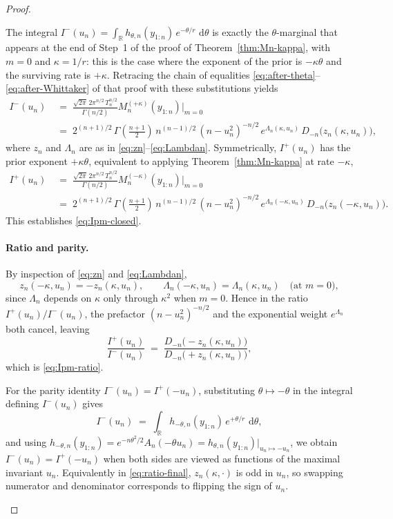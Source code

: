 \documentclass[12pt, a4paper]{report}
\newcommand{\dd}{\,\mathrm{d}}
\newcommand{\1}{\mathbf{1}}
\begin{document}
\begin{proof}
\begin{enumerate}
The integral $I^-(u_n) = \int_\mathbb{R} h_{\theta,n}(y_{1:n})\,e^{-\theta/r}\,
\dd\theta$ is exactly the $\theta$-marginal that appears at the end of
Step~1 of the proof of Theorem~\ref{thm:Mn-kappa}, with $m=0$ and
$\kappa = 1/r$: this is the case where the exponent of the prior is
$-\kappa\theta$ and the surviving rate is $+\kappa$. Retracing the
chain of equalities \eqref{eq:after-theta}--\eqref{eq:after-Whittaker}
of that proof with these substitutions yields
\begin{align*}
  I^-(u_n)
  &  \;=\; \frac{\sqrt{2\pi} \, 2\pi^{n/2} \, T_n^{n/2} }{\Gamma(n/2)} M_n^{(+\kappa)}(y_{1:n})\big|_{m=0} \\
  & \;=\;2^{(n+1)/2} \, \Gamma \left( \frac{n+1}{2}\right) \, n^{(n-1)/2} \, (n-u_n^2)^{-n/2} \,
  e^{\Lambda_n(\kappa,u_n)}\,
  D_{-n}\!\bigl(z_n(\kappa,u_n)\bigr)
  ,
\end{align*}
where $z_n$ and $\Lambda_n$ are as in
\eqref{eq:zn}--\eqref{eq:Lambdan}. Symmetrically, $I^+(u_n)$ has the
prior exponent $+\kappa\theta$, equivalent to applying
Theorem~\ref{thm:Mn-kappa} at rate $-\kappa$,
\begin{align*}
  I^+(u_n)
  & \;=\; \frac{\sqrt{2\pi} \, 2\pi^{n/2} \, T_n^{n/2} }{\Gamma(n/2)} M_n^{(-\kappa)}(y_{1:n})\big|_{m=0}\\
  & \;=\; 2^{(n+1)/2} \, \Gamma \left( \frac{n+1}{2}\right) \, n^{(n-1)/2} \, (n-u_n^2)^{-n/2} \, 
  e^{\Lambda_n(-\kappa,u_n)}\,
  D_{-n}\!\bigl(z_n(-\kappa,u_n)\bigr).
\end{align*}
This establishes \eqref{eq:Ipm-closed}.

\paragraph{Ratio and parity.} By inspection of \eqref{eq:zn} and \eqref{eq:Lambdan},
\[
  z_n(-\kappa,u_n) = -z_n(\kappa,u_n),
  \qquad
  \Lambda_n(-\kappa,u_n) = \Lambda_n(\kappa,u_n)
  \quad\text{(at $m=0$)},
\]
since $\Lambda_n$ depends on $\kappa$ only through $\kappa^2$ when
$m=0$. Hence in the ratio $I^+(u_n)/I^-(u_n)$, the prefactor
$(n-u_n^2)^{-n/2}$ and the exponential weight $e^{\Lambda_n}$
both cancel, leaving
\begin{equation}\label{eq:ratio-final}
  \frac{I^+(u_n)}{I^-(u_n)}
  \;=\;\frac{D_{-n}\!\bigl(-z_n(\kappa,u_n)\bigr)}
            {D_{-n}\!\bigl(+z_n(\kappa,u_n)\bigr)},
\end{equation}
which is \eqref{eq:Ipm-ratio}.


For the parity identity $I^-(u_n) = I^+(-u_n)$, substituting
$\theta\mapsto-\theta$ in the integral defining $I^-(u_n)$ gives
\[
  I^-(u_n)
  \;=\;\int_\mathbb{R} h_{-\theta,n}(y_{1:n})\,e^{+\theta/r}\,\dd\theta,
\]
and using $h_{-\theta,n}(y_{1:n}) = e^{-n\theta^2/2}A_n(-\theta u_n)
= h_{\theta,n}(y_{1:n})\big|_{u_n\mapsto-u_n}$, we obtain
$I^-(u_n) = I^+(-u_n)$ when both sides are viewed as functions of
the maximal invariant $u_n$. Equivalently in
\eqref{eq:ratio-final}, $z_n(\kappa,\cdot)$ is odd in $u_n$, so
swapping numerator and denominator corresponds to flipping the sign of
$u_n$.


\end{enumerate}
\end{proof}
\end{document}
